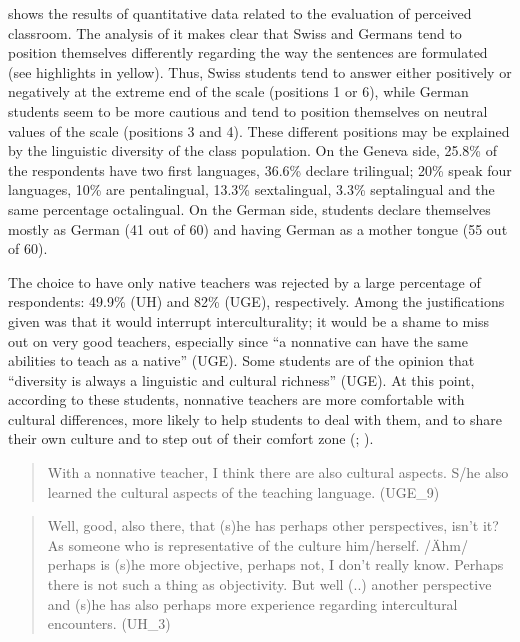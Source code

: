 \documentclass[output=paper]{../langscibook}
\begin{document}
 shows the results of quantitative data related to the evaluation of perceived classroom. The analysis of it makes clear that Swiss and Germans tend to position themselves differently regarding the way the sentences are formulated (see highlights in yellow). Thus, Swiss students tend to answer either positively or negatively at the extreme end of the scale (positions 1 or 6), while German students seem to be more cautious and tend to position themselves on neutral values of the scale (positions 3 and 4). These different positions may be explained by the linguistic diversity of the class population. On the Geneva side, 25.8\% of the respondents have two first languages, 36.6\% declare trilingual; 20\% speak four languages, 10\% are pentalingual, 13.3\% sextalingual, 3.3\% septalingual and the same percentage octalingual. On the German side, students declare themselves mostly as German (41 out of 60) and having German as a mother tongue (55 out of 60).

The choice to have only native teachers was rejected by a large percentage of respondents: 49.9\% (UH) and 82\% (UGE), respectively. Among the justifications given was that it would interrupt interculturality; it would be a shame to miss out on very good teachers, especially since “a nonnative can have the same abilities to teach as a native” (UGE). Some students are of the opinion that “diversity is always a linguistic and cultural richness” (UGE). At this point, according to these students, nonnative teachers are more comfortable with cultural differences, more likely to help students to deal with them, and to share their own culture and to step out of their comfort zone (\citealt{Pratt1991}; \citealt{Yanaprasart2017}).

\begin{quote}
With a nonnative teacher, I think there are also cultural aspects. S/he also learned the cultural aspects of the teaching language. (UGE\_9)
\end{quote}

\begin{quote}
Well, good, also there, that (s)he has perhaps other perspectives, isn’t it?  As someone who is representative of the culture him/herself. /Ähm/ perhaps is (s)he more objective, perhaps not, I don’t really know. Perhaps there is not such a thing as objectivity. But well (..) another perspective and (s)he has also perhaps more experience regarding intercultural encounters. (UH\_3)
\end{quote}
\end{document}
